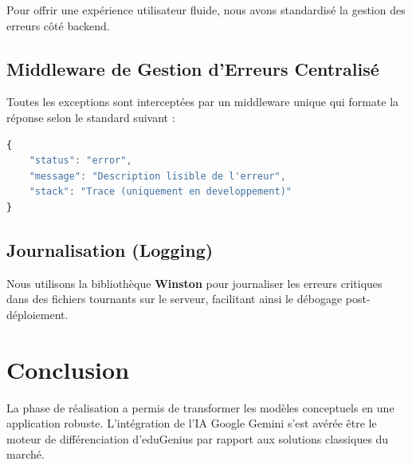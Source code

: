 Pour offrir une expérience utilisateur fluide, nous avons standardisé la gestion des erreurs côté backend.

\subsection{Middleware de Gestion d'Erreurs Centralisé}
Toutes les exceptions sont interceptées par un middleware unique qui formate la réponse selon le standard suivant :
\begin{lstlisting}[language=JavaScript, caption=Structure d'une réponse d'erreur standard]
{
    "status": "error",
    "message": "Description lisible de l'erreur",
    "stack": "Trace (uniquement en developpement)"
}
\end{lstlisting}

\subsection{Journalisation (Logging)}
Nous utilisons la bibliothèque \textbf{Winston} pour journaliser les erreurs critiques dans des fichiers tournants sur le serveur, facilitant ainsi le débogage post-déploiement.

\section{Conclusion}
La phase de réalisation a permis de transformer les modèles conceptuels en une application robuste. L'intégration de l'IA Google Gemini s'est avérée être le moteur de différenciation d'eduGenius par rapport aux solutions classiques du marché.
